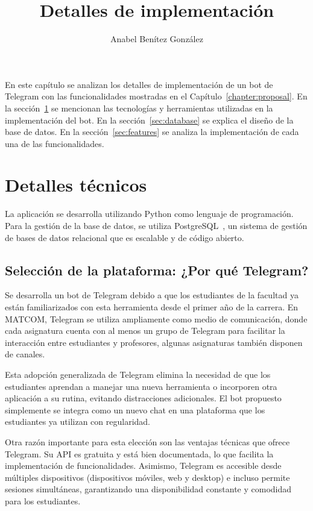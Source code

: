 \documentclass{article}
\title{Detalles de implementación}
\author{Anabel Benítez González}
\date{}
\begin{document}
\maketitle

En este capítulo se analizan los detalles de implementación de un bot de Telegram con las funcionalidades mostradas en el Capítulo~\ref{chapter:proposal}. En la sección~\ref{sec:technical-details} se mencionan las tecnologías y herramientas utilizadas en la implementación del bot. En la sección~\ref{sec:database} se explica el diseño de la base de datos. En la sección~\ref{sec:features} se analiza la implementación de cada una de las funcionalidades.

\section{Detalles técnicos}\label{sec:technical-details}

La aplicación se desarrolla utilizando Python como lenguaje de programación. Para la gestión de la base de datos, se utiliza PostgreSQL~\cite{postgresql}, un sistema de gestión de bases de datos relacional que es escalable y de código abierto.

\subsection{Selección de la plataforma: ¿Por qué Telegram?}

Se desarrolla un bot de Telegram debido a que los estudiantes de la facultad ya están familiarizados con esta herramienta desde el primer año de la carrera. En \mbox{MATCOM}, Telegram se utiliza ampliamente como medio de comunicación, donde cada asignatura cuenta con al menos un grupo de Telegram para facilitar la interacción entre estudiantes y profesores, algunas asignaturas también disponen de canales. 

Esta adopción generalizada de Telegram elimina la necesidad de que los estudiantes aprendan a manejar una nueva herramienta o incorporen otra aplicación a su rutina, evitando distracciones adicionales. El bot propuesto simplemente se integra como un nuevo chat en una plataforma que los estudiantes ya utilizan con regularidad.

Otra razón importante para esta elección son las ventajas técnicas que ofrece Telegram. Su API es gratuita y está bien documentada, lo que facilita la implementación de funcionalidades. Asimismo, Telegram es accesible desde múltiples dispositivos (dispositivos móviles, web y desktop) e incluso permite sesiones simultáneas, garantizando una disponibilidad constante y comodidad para los estudiantes.
\end{document}
